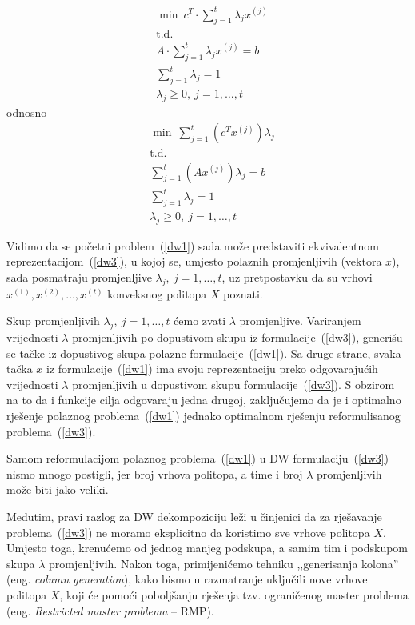 \documentclass[b5paper, utf8, 11pt, colorlinks]{book}
\theoremstyle{definition}
\begin{document}
 
   \begin{equation}
 	\begin{aligned}\label{dw2}
 	&	\min\  c^T\cdot \sum_{j=1}^t\lambda_jx^{(j)}\\
 		&\mbox{t.d.}\\  
 		&A\cdot \sum_{j=1}^t\lambda_jx^{(j)}=b\\
 		 		 &\sum_{j=1}^t\lambda_j = 1\\
 		&\lambda_j\geqslant 0,\ j = 1,\ldots,t
 	\end{aligned}
 \end{equation}
odnosno
    \begin{equation}
 	\begin{aligned}\label{dw3}
 		&\min\  \sum_{j=1}^t(c^T x^{(j)})\lambda_j\\
 			&\mbox{t.d.}\\   
 		&\sum_{j=1}^t (A x^{(j)})\lambda_j=b\\
 		&\sum_{j=1}^t\lambda_j = 1\\
 		&\lambda_j\geqslant 0,\ j = 1,\ldots,t
 	\end{aligned}
 \end{equation}
 
 Vidimo da se početni problem~(\ref{dw1}) sada može predstaviti ekvivalentnom reprezentacijom~(\ref{dw3}), u kojoj se, umjesto polaznih promjenljivih (vektora $x$), sada posmatraju promjenljive $\lambda_j,\ j = 1,\ldots,t$, uz pretpostavku da su  vrhovi $x^{(1)},x^{(2)},\dots,x^{(t)}$ konveksnog politopa $X$ poznati.
 
 Skup promjenljivih $\lambda_j,\ j = 1,\ldots,t$ ćemo zvati $\lambda$ promjenljive.
  Variranjem vrijednosti $\lambda$ promjenljivih po dopustivom skupu iz formulacije~(\ref{dw3}), generišu se tačke iz dopustivog skupa polazne formulacije~(\ref{dw1}). Sa druge strane, svaka tačka $x$ iz formulacije~(\ref{dw1}) ima svoju reprezentaciju preko odgovarajućih vrijednosti  $\lambda$ promjenljivih u dopustivom skupu formulacije~(\ref{dw3}). S obzirom na to da i funkcije cilja odgovaraju jedna drugoj, zaključujemo da je i optimalno rješenje polaznog problema~(\ref{dw1}) jednako optimalnom rješenju reformulisanog problema~(\ref{dw3}).
 
 Samom reformulacijom polaznog problema~(\ref{dw1}) u DW formulaciju~(\ref{dw3}) nismo mnogo postigli, jer broj vrhova politopa, a time i broj $\lambda$ promjenljivih može biti jako veliki.
 
 Međutim, pravi razlog za DW dekompoziciju leži u činjenici da za rješavanje problema~(\ref{dw3}) ne moramo eksplicitno da koristimo sve vrhove politopa $X$. Umjesto toga, krenućemo od jednog   manjeg podskupa, a samim tim i podskupom skupa $\lambda$ promjenljivih. Nakon toga, primijenićemo tehniku ,,generisanja kolona'' (eng. \emph{column generation}), kako bismo u razmatranje uključili nove vrhove politopa $X$, koji će pomoći poboljšanju rješenja tzv. ograničenog master problema (eng. \emph{Restricted master problema} -- RMP).
 
\end{document}
